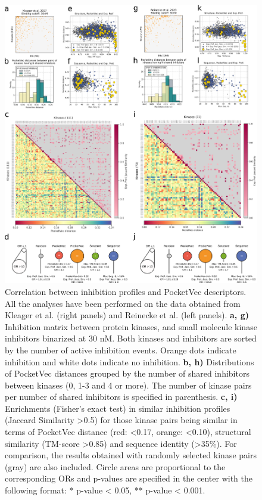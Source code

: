 \begin{figure}[H]
  \centering
  \includegraphics[width=\linewidth]{figures/PocketVec/Main/Fig7.png} 
  \caption{
    Correlation between inhibition profiles and PocketVec descriptors. All the analyses have been performed on the data obtained from Kleager et al.\cite{klaeger_target_2017} (right panels) and Reinecke et al.\cite{reinecke_chemical_2023} (left panels).
    \textbf{a, g)} Inhibition matrix between protein kinases, and small molecule kinase inhibitors binarized at 30 nM. Both kinases and inhibitors are sorted by the number of active inhibition events. Orange dots indicate inhibition and white dots indicate no inhibition.
    \textbf{b, h)} Distributions of PocketVec distances grouped by the number of shared inhibitors between kinases (0, 1-3 and 4 or more). The number of kinase pairs per number of shared inhibitors is specified in parenthesis.
    \textbf{c, i)} Enrichments (Fisher’s exact test) in similar inhibition profiles (Jaccard Similarity >0.5) for those kinase pairs being similar in terms of PocketVec distance (red: <0.17, orange: <0.10), structural similarity (TM-score >0.85) and sequence identity (>35\%). For comparison, the results obtained with randomly selected kinase pairs (gray) are also included. Circle areas are proportional to the corresponding ORs and p-values are specified in the center with the following format: * p-value < 0.05, ** p-value < 0.001.
}
\end{figure}
